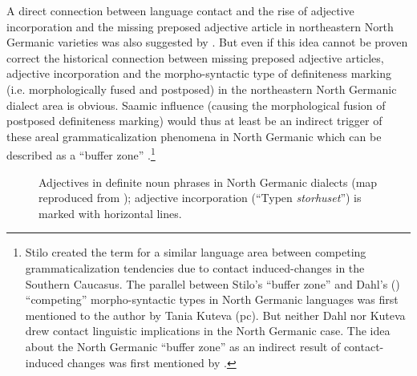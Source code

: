 {A direct connection between language contact and the rise of adjective incorporation and the missing preposed adjective article in northeastern North Germanic varieties was also suggested by \cite{riesler2001a,riesler2002a}. But even if this idea cannot be proven correct the historical connection between missing preposed adjective articles, adjective incorporation and the morpho-syntactic type of definiteness marking (i.e. morphologically fused and postposed) in the northeastern North Germanic dialect area is obvious. Saamic influence (causing the morphological fusion of postposed definiteness marking) would thus at least be an indirect trigger of these areal grammaticalization phenomena in North Germanic which can be described as a “buffer zone” \citep{stilo2005}.\footnote{Stilo created the term for a similar language area between competing grammaticalization tendencies due to contact induced-changes in the Southern Caucasus. The parallel between Stilo's “buffer zone” and Dahl's (\citeyear{dahl2003}) “competing” morpho-syntactic types in North Germanic languages was first mentioned to the author by Tania Kuteva (pc). But neither Dahl nor Kuteva drew contact linguistic implications in the North Germanic case. The idea about the North Germanic “buffer zone” as an indirect result of contact-induced changes was first mentioned by \cite{riesler2006a}.}
\begin{figure}[h]
\caption[Adjectives in definite noun phrases]{Adjectives in definite noun phrases in North Germanic dialects (map reproduced from \citealt{delsing1996b}); adjective incorporation (“Typen \textit{storhuset}”) is marked with horizontal lines.}
\label{Delsing9}
\end{figure}

}
